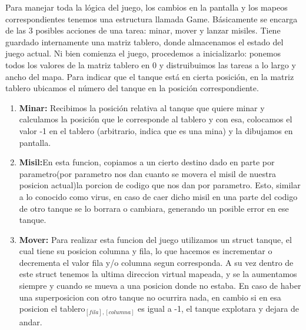 Para manejar toda la lógica del juego, los cambios en la pantalla y los mapeos correspondientes tenemos una estructura
llamada Game. Básicamente se encarga de las 3 posibles acciones de una tarea: minar, mover y lanzar misiles.
Tiene guardado internamente una matriz tablero, donde almacenamos el estado del juego actual. 
Ni bien comienza el juego, procedemos a inicializarlo: ponemos todos los valores de la matriz tablero en 0
y distruibuimos las tareas a lo largo y ancho del mapa. Para indicar que el tanque está en cierta posición,
en la matriz tablero ubicamos el número del tanque en la posición correspondiente.

\begin{enumerate}
 \item \textbf{Minar:} Recibimos la posición relativa al tanque que quiere minar y calculamos la posición que le corresponde
 al tablero y con esa, colocamos el valor -1 en el tablero (arbitrario, indica que es una mina) y la dibujamos en pantalla.
 \item \textbf{Misil:}En esta funcion, copiamos a un cierto destino dado en parte por parametro(por parametro nos dan cuanto se movera el misil de nuestra
 posicion actual)la porcion de codigo que nos dan por parametro.
 Esto, similar a lo conocido como virus, en caso de caer dicho misil en una parte del codigo de otro tanque se lo borrara o cambiara,
 generando un posible error en ese tanque.
 \item \textbf{Mover:} Para realizar esta funcion del juego utilizamos un struct tanque, el cual tiene su posicion columna y fila,
 lo que hacemos es incrementar o decrementa el valor fila y/o columna segun corresponda. A su vez dentro de este struct tenemos
 la ultima direccion virtual mapeada, y se la aumentamos siempre y cuando se mueva a una posicion donde no estaba.
 En caso de haber una superposicion con otro tanque no ocurrira nada, en cambio si en esa posicion el tablero$_{[fila],[columna]}$
 es igual a -1, el tanque explotara y dejara de andar.
\end{enumerate}
